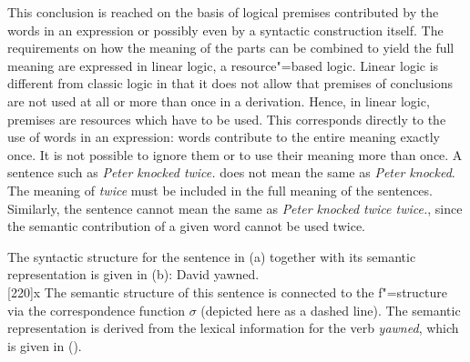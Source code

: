 This conclusion is reached on the basis of logical premises contributed by the words in an
expression or possibly even by a syntactic construction itself. The requirements on how the meaning
of the parts can be combined to yield the full meaning are expressed in linear logic, a
resource"=based logic. Linear logic is different from classic logic in that it does not allow that
premises of conclusions are not used at all or more than once in a derivation. Hence, in linear logic, premises
are resources which have to be used. This corresponds directly to the use of words in an expression:
words contribute to the entire meaning exactly once. It is not possible to ignore them or to use
their meaning more than once. A sentence such as \emph{Peter knocked twice.} does not mean the same as \emph{Peter knocked}. The meaning of
\emph{twice} must be included in the full meaning of the sentences. Similarly, the sentence cannot
mean the same as \emph{Peter knocked twice twice.}, since the semantic contribution of a given word cannot be used twice.

The syntactic structure for the sentence in (a) together with its semantic representation is
given in (b):
\eal
\ex David yawned.
\ex ~\\[-\baselineskip]
\hspace*{-2em}
{}%
\hspace*{3em}%
{}%
\hspace*{2em}%
\Aput*{$\phi$}
[220]{x}
\Bput*{$\sigma$}
\zl
% 
The semantic structure of this sentence is connected to the f"=structure via the correspondence function $\sigma$ (depicted here as a dashed line). The semantic representation is
derived from the lexical information for the verb \emph{yawned}, which is given in ().


